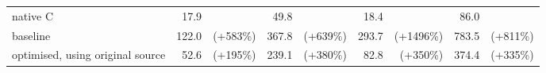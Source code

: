\begin{table*}[]
\begin{minipage}{\textwidth}
\begin{tabular}{lrrrrrrrr}
                                                                     
\hline
native C                                                             &        17.9 &                &          49.8 &                &        18.4   &                  &         86.0 &                \\
baseline                                                             &       122.0 &       (+583\%) &         367.8 &       (+639\%) &       293.7   &       (+1496\%)  &        783.5 &       (+811\%) \\
optimised, using original source                                     &        52.6 &       (+195\%) &         239.1 &       (+380\%) &        82.8   &        (+350\%)  &        374.4 &       (+335\%) \\

\end{tabular}
\end{minipage}
\end{table*}
